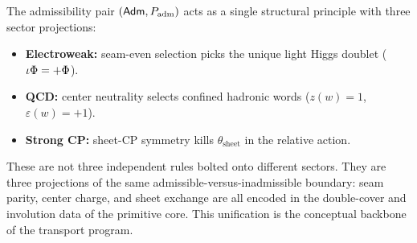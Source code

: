 \begin{remark}
The admissibility pair $(\mathsf{Adm},P_{\mathrm{adm}})$ acts as a single structural principle with three sector projections:
\begin{itemize}[leftmargin=1.5em, topsep=3pt, itemsep=2pt]
    \item \textbf{Electroweak:} seam-even selection picks the unique light Higgs doublet ($\iota\Phi=+\Phi$).
    \item \textbf{QCD:} center neutrality selects confined hadronic words ($z(w)=1$, $\varepsilon(w)=+1$).
    \item \textbf{Strong CP:} sheet-CP symmetry kills $\theta_{\mathrm{sheet}}$ in the relative action.
\end{itemize}
These are not three independent rules bolted onto different sectors. They are three projections of the same admissible-versus-inadmissible boundary: seam parity, center charge, and sheet exchange are all encoded in the double-cover and involution data of the primitive core. This unification is the conceptual backbone of the transport program.
\end{remark}

